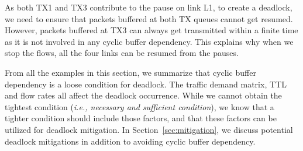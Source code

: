 As both TX1 and TX3 contribute to the pause on link L1, to create a deadlock, we need to ensure that 
packets buffered at both TX queues cannot get resumed. However, packets buffered at TX3 can always get 
transmitted within a finite time as it is not involved in any cyclic buffer dependency. This explains 
why when we stop the flows, all the four links can be resumed from the pauses. 
\fi


 From all the examples in this section, we summarize that cyclic buffer dependency is
 a loose condition for deadlock. The traffic demand matrix, TTL and flow rates all affect the deadlock
 occurrence. While we cannot obtain the tightest condition ({\em i.e., necessary and sufficient condition}), 
we know that a tighter condition should include those factors, and that these factors can be utilized
for deadlock mitigation. In Section~\ref{sec:mitigation}, we discuss potential deadlock mitigations in 
addition to avoiding cyclic buffer dependency.

